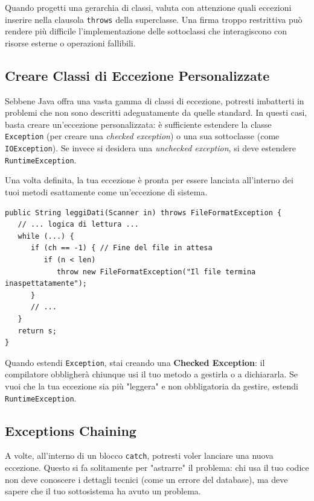 \begin{bestpractice}
Quando progetti una gerarchia di classi, valuta con attenzione quali eccezioni inserire nella clausola \texttt{throws} della superclasse. Una firma troppo restrittiva può rendere più difficile l'implementazione delle sottoclassi che interagiscono con risorse esterne o operazioni fallibili.
\end{bestpractice}

\subsection{Creare Classi di Eccezione Personalizzate}

Sebbene Java offra una vasta gamma di classi di eccezione, potresti imbatterti in problemi che non sono descritti adeguatamente da quelle standard. In questi casi, basta creare un'eccezione personalizzata: è sufficiente estendere la classe \texttt{Exception} (per creare una \textit{checked exception}) o una sua sottoclasse (come \texttt{IOException}). Se invece si desidera una \textit{unchecked exception}, si deve estendere \texttt{RuntimeException}.

Una volta definita, la tua eccezione è pronta per essere lanciata all'interno dei tuoi metodi esattamente come un'eccezione di sistema.

\begin{lstlisting}[caption={Lancio di un'eccezione personalizzata}]
public String leggiDati(Scanner in) throws FileFormatException {
   // ... logica di lettura ...
   while (...) {
      if (ch == -1) { // Fine del file in attesa
         if (n < len)
            throw new FileFormatException("Il file termina inaspettatamente");
      }
      // ...
   }
   return s;
}
\end{lstlisting}

\begin{tip}
Quando estendi \texttt{Exception}, stai creando una \textbf{Checked Exception}: il compilatore obbligherà chiunque usi il tuo metodo a gestirla o a dichiararla. Se vuoi che la tua eccezione sia più "leggera" e non obbligatoria da gestire, estendi \texttt{RuntimeException}.
\end{tip}

\subsection{Exceptions Chaining}

A volte, all'interno di un blocco \texttt{catch}, potresti voler lanciare una nuova eccezione. Questo si fa solitamente per "astrarre" il problema: chi usa il tuo codice non deve conoscere i dettagli tecnici (come un errore del database), ma deve sapere che il tuo sottosistema ha avuto un problema.

